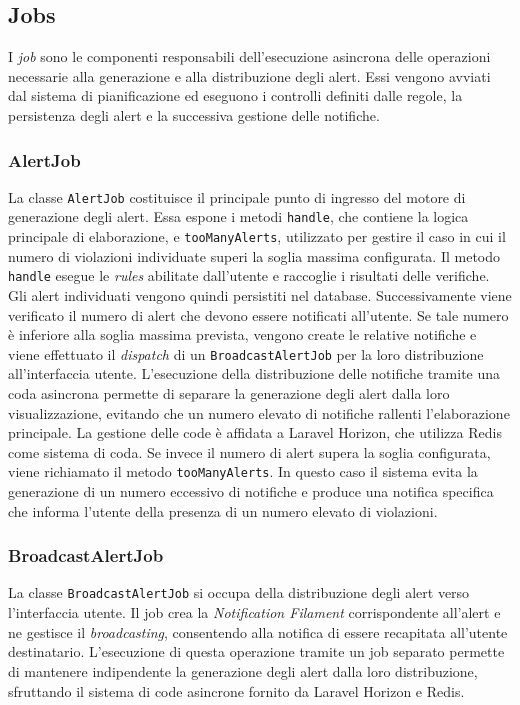 \subsection{Jobs}
I \textit{job} sono le componenti responsabili dell'esecuzione asincrona delle operazioni necessarie alla generazione e alla distribuzione degli alert. Essi vengono avviati 
dal sistema di pianificazione ed eseguono i controlli definiti dalle regole, la persistenza degli alert e la successiva gestione delle notifiche.

\subsubsection*{AlertJob}
La classe \texttt{AlertJob} costituisce il principale punto di ingresso del motore di generazione degli alert. Essa espone i metodi \texttt{handle}, che contiene 
la logica principale di elaborazione, e \texttt{tooManyAlerts}, utilizzato per gestire il caso in cui il numero di violazioni individuate superi la soglia massima configurata.
\newline
Il metodo \texttt{handle} esegue le \textit{rules} abilitate dall'utente e raccoglie i risultati delle verifiche. Gli alert individuati vengono quindi persistiti nel database. 
Successivamente viene verificato il numero di alert che devono essere notificati all'utente. Se tale numero è inferiore alla soglia massima prevista, vengono create le relative 
notifiche e viene effettuato il \textit{dispatch} di un \texttt{BroadcastAlertJob} per la loro distribuzione all'interfaccia utente.
\newline
L'esecuzione della distribuzione delle notifiche tramite una coda asincrona permette di separare la generazione degli alert dalla loro visualizzazione, evitando che un numero 
elevato di notifiche rallenti l'elaborazione principale. La gestione delle code è affidata a Laravel Horizon, che utilizza Redis come sistema di coda.
\newline
Se invece il numero di alert supera la soglia configurata, viene richiamato il metodo \texttt{tooManyAlerts}. In questo caso il sistema evita la generazione di un numero 
eccessivo di notifiche e produce una notifica specifica che informa l'utente della presenza di un numero elevato di violazioni.

\subsubsection*{BroadcastAlertJob}
La classe \texttt{BroadcastAlertJob} si occupa della distribuzione degli alert verso l'interfaccia utente. Il job crea la \textit{Notification Filament} corrispondente all'alert 
e ne gestisce il \textit{broadcasting}, consentendo alla notifica di essere recapitata all'utente destinatario.
\newline
L'esecuzione di questa operazione tramite un job separato permette di mantenere indipendente la generazione degli alert dalla loro distribuzione, sfruttando il sistema di code 
asincrone fornito da Laravel Horizon e Redis.

